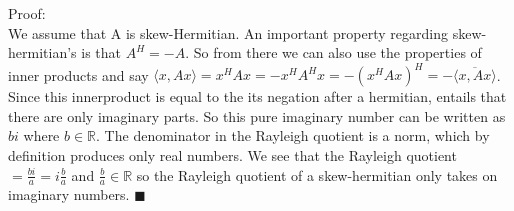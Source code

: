 \documentclass[letterpaper,12pt]{article}
\theoremstyle{definition}
\begin{document}
Proof:\\
We assume that A is skew-Hermitian. An important property regarding skew-hermitian's is that $A^H=-A$. So from there we can also use the properties of inner products and say $\langle x, Ax\rangle = x^HAx = -x^HA^Hx = -(x^HAx)^H  = -\overline{\langle x,Ax\rangle}$. Since this innerproduct is equal to the its negation after a hermitian, entails that there are only imaginary parts. So this pure imaginary number can be written as $bi$ where $b\in \mathbb{R}$. The denominator in the Rayleigh quotient is a norm, which by definition produces only real numbers. We see that the Rayleigh quotient $=\frac{bi}{a} = i\frac{b}{a}$ and $\frac{b}{a}\in \mathbb{R}$ so the Rayleigh quotient of a skew-hermitian only takes on imaginary numbers. \hfill $\blacksquare$\\
\end{document}
